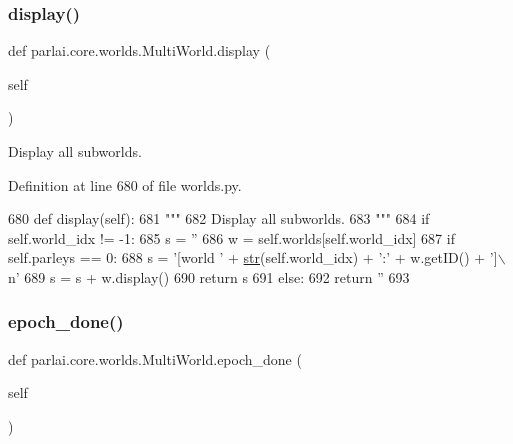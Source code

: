 \subsubsection{\texorpdfstring{display()}{display()}}
{\footnotesize\ttfamily def parlai.\+core.\+worlds.\+Multi\+World.\+display (\begin{DoxyParamCaption}\item[{}]{self }\end{DoxyParamCaption})}

\begin{DoxyVerb}Display all subworlds.
\end{DoxyVerb}
 

Definition at line 680 of file worlds.\+py.


\begin{DoxyCode}
680     \textcolor{keyword}{def }display(self):
681         \textcolor{stringliteral}{"""}
682 \textcolor{stringliteral}{        Display all subworlds.}
683 \textcolor{stringliteral}{        """}
684         \textcolor{keywordflow}{if} self.world\_idx != -1:
685             s = \textcolor{stringliteral}{''}
686             w = self.worlds[self.world\_idx]
687             \textcolor{keywordflow}{if} self.parleys == 0:
688                 s = \textcolor{stringliteral}{'[world '} + \hyperlink{namespacegenerate__task__READMEs_a5b88452ffb87b78c8c85ececebafc09f}{str}(self.world\_idx) + \textcolor{stringliteral}{':'} + w.getID() + \textcolor{stringliteral}{']\(\backslash\)n'}
689             s = s + w.display()
690             \textcolor{keywordflow}{return} s
691         \textcolor{keywordflow}{else}:
692             \textcolor{keywordflow}{return} \textcolor{stringliteral}{''}
693 
\end{DoxyCode}
\mbox{\label{classparlai_1_1core_1_1worlds_1_1MultiWorld_a7034326fa264402e0857a98d1ec688de}} 
\subsubsection{\texorpdfstring{epoch\+\_\+done()}{epoch\_done()}}
{\footnotesize\ttfamily def parlai.\+core.\+worlds.\+Multi\+World.\+epoch\+\_\+done (\begin{DoxyParamCaption}\item[{}]{self }\end{DoxyParamCaption})}

